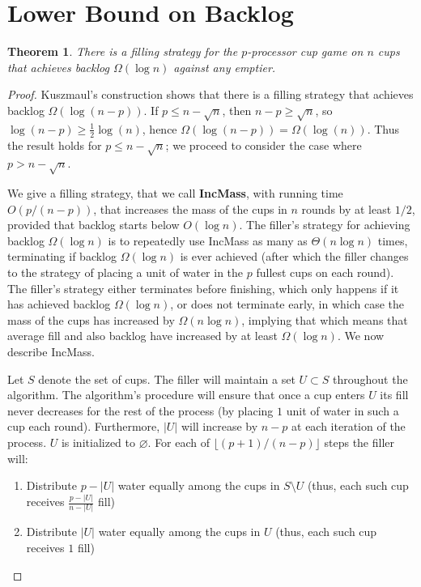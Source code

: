 \documentclass[11pt]{article}
\newtheorem{theorem}{Theorem}
\begin{document}
\section{Lower Bound on Backlog}
\begin{theorem}
  There is a filling strategy for the $p$-processor cup game on
  $n$ cups that achieves backlog $\Omega(\log n)$ against any emptier.
\end{theorem}
\begin{proof}
Kuszmaul's construction shows that there is a filling strategy
that achieves backlog $\Omega(\log (n-p))$.  If $p \le n -
\sqrt{n}$, then $n-p \ge \sqrt{n}$, so $\log (n-p) \ge
\frac{1}{2}\log (n)$, hence $\Omega(\log(n-p)) =
\Omega(\log(n))$. Thus the result holds for $p \le n - \sqrt{n}$;
we proceed to consider the case where $p > n-\sqrt{n}$.

We give a filling strategy, that we call \textbf{IncMass}, with
running time $O(p/(n-p))$, that increases the mass of the cups in
$n$ rounds by at least $1/2$, provided that backlog starts below
$O(\log n)$. The filler's strategy for achieving backlog
$\Omega(\log n)$ is to repeatedly use IncMass as many as
$\Theta(n\log n)$ times, terminating if backlog $\Omega(\log n)$
is ever achieved (after which the filler changes to the strategy
of placing a unit of water in the $p$ fullest cups on each
round). The filler's strategy either terminates before finishing,
which only happens if it has achieved backlog $\Omega(\log n)$,
or does not terminate early, in which case the mass of the cups
has increased by $\Omega(n\log n)$, implying that which means
that average fill and also backlog have increased by at least
$\Omega(\log n)$. We now describe IncMass.

Let $S$ denote the set of cups. The filler will maintain a set $U
\subset S$ throughout the algorithm. The algorithm's procedure
will ensure that once a cup enters $U$ its fill never decreases
for the rest of the process (by placing $1$ unit of water in such
a cup each round). Furthermore, $|U|$ will increase by $n-p$ at
each iteration of the process. $U$ is initialized to $\varnothing$.
For each of $\lfloor(p+1) / (n-p)\rfloor$ steps the filler will:
\begin{enumerate}
  \item Distribute $p - |U|$ water equally among the cups in
    $S\setminus U$ (thus, each such cup receives
    $\frac{p-|U|}{n-|U|}$ fill)
  \item Distribute $|U|$ water equally among the cups in $U$
    (thus, each such cup receives $1$ fill)
\end{enumerate}


\end{proof}
\end{document}
